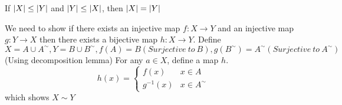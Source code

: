 \begin{myTheo}
	If $\lvert X\rvert\leq\lvert Y\rvert$ and $\lvert Y\rvert\leq\lvert X\rvert$, then $\lvert X\rvert=\lvert Y\rvert$
\end{myTheo}
\begin{myPf}
	We need to show if there exists an injective map $f: X\rightarrow Y$ and an injective map $g: Y\rightarrow X$ then there exists a bijective map $h: X\rightarrow Y$.
	\newline
	\newline
	Define $X=A\cup A^\sim, Y=B\cup B^\sim, f(A)=B(Surjective\ to\ B), g(B^\sim)=A^\sim(Surjective\ to\ A^\sim)$(Using decomposition lemma)
	\newline
	For any $a\in X$, define a map $h$.
	\[
	h(x)=\left.
	\begin{cases}
	f(x) & x\in A\\
	g^{-1}(x) & x\in A^\sim
	\end{cases}
	\right.
	\]
	which shows $X\sim Y$
\end{myPf}